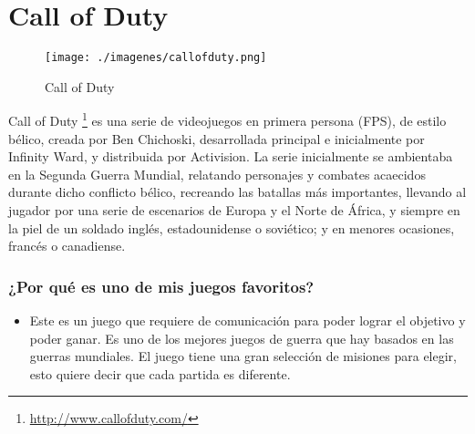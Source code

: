 \section{Call of Duty}

\begin{figure}[htbp]
\begin{center}
\texttt{[image: ./imagenes/callofduty.png]}
\caption{Call of Duty}
\label{Call of Duty}
\end{center}
\end{figure}
Call of Duty \footnote{\url{http://www.callofduty.com/}} es una serie de videojuegos en primera persona (FPS), de estilo bélico, creada por Ben Chichoski, desarrollada principal e inicialmente por Infinity Ward, y distribuida por Activision.
La serie inicialmente se ambientaba en la Segunda Guerra Mundial, relatando personajes y combates acaecidos durante dicho conflicto bélico, recreando las batallas más importantes, llevando al jugador por una serie de escenarios de Europa y el Norte de África, y siempre en la piel de un soldado inglés, estadounidense o soviético; y en menores ocasiones, francés o canadiense.


\subsubsection{¿Por qué es uno de mis juegos favoritos?}
\begin{itemize}
\item Este es un juego que requiere de comunicación para poder lograr el objetivo y poder ganar.  Es uno de los mejores juegos de guerra que hay basados en las guerras mundiales. El juego tiene una gran selección de misiones para elegir, esto quiere decir que cada partida es diferente.
\end{itemize}